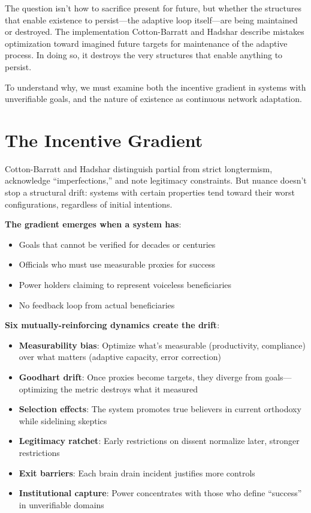 \documentclass[12pt,a4paper]{article}
\begin{document}
The question isn't how to sacrifice present for future, but whether the structures that enable existence to persist---the adaptive loop itself---are being maintained or destroyed. The implementation Cotton-Barratt and Hadshar describe mistakes optimization toward imagined future targets for maintenance of the adaptive process. In doing so, it destroys the very structures that enable anything to persist.

To understand why, we must examine both the incentive gradient in systems with unverifiable goals, and the nature of existence as continuous network adaptation.

\section{The Incentive Gradient}

Cotton-Barratt and Hadshar distinguish partial from strict longtermism, acknowledge ``imperfections,'' and note legitimacy constraints. But nuance doesn't stop a structural drift: systems with certain properties tend toward their worst configurations, regardless of initial intentions.

\textbf{The gradient emerges when a system has}:
\begin{itemize}
\item Goals that cannot be verified for decades or centuries
\item Officials who must use measurable proxies for success
\item Power holders claiming to represent voiceless beneficiaries
\item No feedback loop from actual beneficiaries
\end{itemize}

\textbf{Six mutually-reinforcing dynamics create the drift}:

\begin{itemize}
\item \textbf{Measurability bias}: Optimize what's measurable (productivity, compliance) over what matters (adaptive capacity, error correction)
\item \textbf{Goodhart drift}: Once proxies become targets, they diverge from goals---optimizing the metric destroys what it measured
\item \textbf{Selection effects}: The system promotes true believers in current orthodoxy while sidelining skeptics
\item \textbf{Legitimacy ratchet}: Early restrictions on dissent normalize later, stronger restrictions
\item \textbf{Exit barriers}: Each brain drain incident justifies more controls
\item \textbf{Institutional capture}: Power concentrates with those who define ``success'' in unverifiable domains
\end{itemize}
\end{document}
